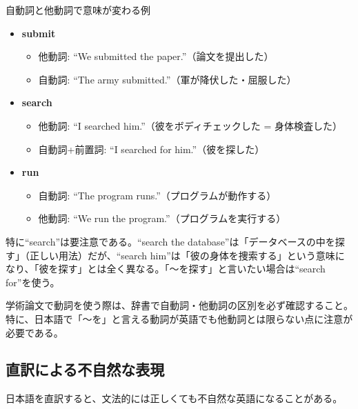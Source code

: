 \begin{itembox}[l]{自動詞と他動詞で意味が変わる例}
\begin{itemize}
\item \textbf{submit}
  \begin{itemize}
  \item 他動詞: ``We submitted the paper.''（論文を提出した）
  \item 自動詞: ``The army submitted.''（軍が降伏した・屈服した）
  \end{itemize}
\item \textbf{search}
  \begin{itemize}
  \item 他動詞: ``I searched him.''（彼をボディチェックした = 身体検査した）
  \item 自動詞+前置詞: ``I searched for him.''（彼を探した）
  \end{itemize}
\item \textbf{run}
  \begin{itemize}
  \item 自動詞: ``The program runs.''（プログラムが動作する）
  \item 他動詞: ``We run the program.''（プログラムを実行する）
  \end{itemize}
\end{itemize}
\end{itembox}

特に``search''は要注意である。``search the database''は「データベースの中を探す」（正しい用法）だが、``search him''は「彼の身体を捜索する」という意味になり、「彼を探す」とは全く異なる。「〜を探す」と言いたい場合は``search for''を使う。

学術論文で動詞を使う際は、辞書で自動詞・他動詞の区別を必ず確認すること。特に、日本語で「〜を」と言える動詞が英語でも他動詞とは限らない点に注意が必要である。

\subsection{直訳による不自然な表現}

日本語を直訳すると、文法的には正しくても不自然な英語になることがある。

